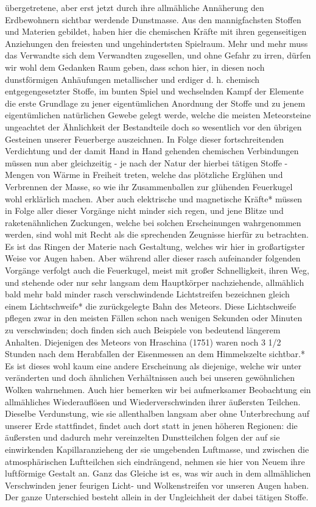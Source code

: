 \documentclass[a4paper, 8pt, oneside, polutonikogreek, german]{article}
\begin{document}
übergetretene, aber erst jetzt durch ihre allmähliche Annäherung den Erdbewohnern sichtbar werdende Dunstmasse. Aus den mannigfachsten Stoffen und Materien gebildet, haben hier die chemischen Kräfte mit ihren gegenseitigen Anziehungen den freiesten und ungehindertsten Spielraum. Mehr und mehr muss das Verwandte sich dem Verwandten zugesellen, und ohne Gefahr zu irren, dürfen wir wohl dem Gedanken Raum geben, dass schon hier, in diesen noch dunstförmigen Anhäufungen metallischer und erdiger d. h. chemisch entgegengesetzter Stoffe, im bunten Spiel und wechselnden Kampf der Elemente die erste Grundlage zu jener eigentümlichen Anordnung der Stoffe und zu jenem eigentümlichen natürlichen Gewebe gelegt werde, welche die meisten Meteorsteine ungeachtet der Ähnlichkeit der Bestandteile doch so wesentlich vor den übrigen Gesteinen unserer Feuerberge auszeichnen. In Folge dieser fortschreitenden Verdichtung und der damit Hand in Hand gehenden chemischen Verbindungen müssen nun aber gleichzeitig - je nach der Natur der hierbei tätigen Stoffe - Mengen von Wärme in Freiheit treten, welche das plötzliche Erglühen und Verbrennen der Masse, so wie ihr Zusammenballen zur glühenden Feuerkugel wohl erklärlich machen. Aber auch elektrische und magnetische Kräfte* müssen in Folge aller dieser Vorgänge nicht minder sich regen, und jene Blitze und raketenähnlichen Zuckungen, welche bei solchen Erscheinungen wahrgenommen werden, sind wohl mit Recht als die sprechenden Zeugnisse hierfür zu betrachten. Es ist das Ringen der Materie nach Gestaltung, welches wir hier in großartigster Weise vor Augen haben. Aber während aller dieser rasch aufeinander folgenden Vorgänge verfolgt auch die Feuerkugel, meist mit großer Schnelligkeit, ihren Weg, und stehende oder nur sehr langsam dem Hauptkörper nachziehende, allmählich bald mehr bald minder rasch verschwindende Lichtstreifen bezeichnen gleich einem Lichtschweife* die zurückgelegte Bahn des Meteors. Diese Lichtschweife pflegen zwar in den meisten Fällen schon nach wenigen Sekunden oder Minuten zu verschwinden; doch finden sich auch Beispiele von bedeutend längerem Anhalten. Diejenigen des Meteors von Hraschina (1751) waren noch 3 1/2 Stunden nach dem Herabfallen der Eisenmessen an dem Himmelszelte sichtbar.* Es ist dieses wohl kaum eine andere Erscheinung als diejenige, welche wir unter veränderten und doch ähnlichen Verhältnissen auch bei unseren gewöhnlichen Wolken wahrnehmen. Auch hier bemerken wir bei aufmerksamer Beobachtung ein allmähliches Wiederauflösen und Wiederverschwinden ihrer äußersten Teilchen. Dieselbe Verdunstung, wie sie allenthalben langsam aber ohne Unterbrechung auf unserer Erde stattfindet, findet auch dort statt in jenen höheren Regionen: die äußersten und dadurch mehr vereinzelten Dunstteilchen folgen der auf sie einwirkenden Kapillaranzieheng der sie umgebenden Luftmasse, und zwischen die atmosphärischen Luftteilchen sich eindrängend, nehmen sie hier von Neuem ihre luftförmige Gestalt an. Ganz das Gleiche ist es, was wir auch in dem allmählichen Verschwinden jener feurigen Licht- und Wolkenstreifen vor unseren Augen haben. Der ganze Unterschied besteht allein in der Ungleichheit der dabei tätigen Stoffe.
\end{document}
